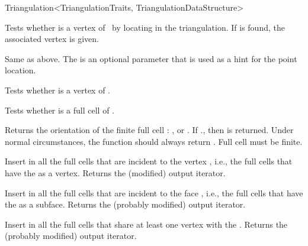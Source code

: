 \begin{ccRefClass}{Triangulation<TriangulationTraits, TriangulationDataStructure>}



 {Tests
whether  is a vertex of \ccVar\ by locating  in the triangulation.  If
 is found, the associated vertex  is given.}

\ccGlue{} {Same as above.  The  is
an optional parameter that is used as a hint for the point location.}

\ccGlue{}
{Tests whether  is a vertex of \ccVar.}

{Tests whether  is a full cell of \ccVar.}

{Returns the orientation of the finite full cell :
\ccGlobalScope{}, \ccGlobalScope{} or
\ccGlobalScope{}. If \ccVar., then
\ccGlobalScope{} is returned. Under normal circumstances, the function
should always return \ccGlobalScope{}.
\ccPrecond Full cell  must be finite.
}

{Insert in  all the full cells that are incident to the vertex
, {i.e.}, the full cells that have the  as a vertex.
Returns the (modified) output iterator.
}

{Insert in  all the full cells that are incident to the face ,
{i.e.}, the full cells that have the  as a subface.
Returns the (probably modified) output iterator.
}

{Insert in  all the full cells that share at least one vertex with the . Returns the (probably modified) output iterator.
}


\end{ccRefClass}
